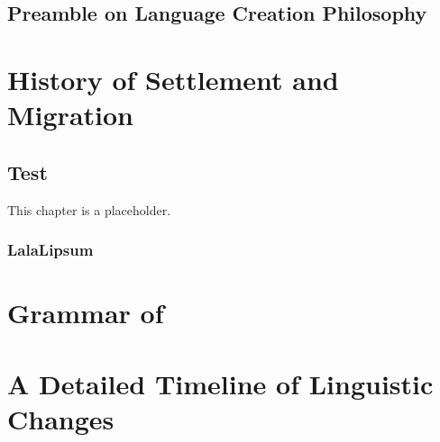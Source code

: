 \documentclass[a4paper,11pt,twoside,openright]{memoir}
\begin{document}
\begin{titlingpage}
\titleTMB
\clearpage
\end{titlingpage}

\frontmatter

\chapter{Preamble on Language Creation Philosophy}
\cleardoublepage

\tableofcontents

\mainmatter
{}

\part{History of \planetadjective{} Settlement and Migration}

\chapter{Test}

This chapter is a placeholder. \engma{} \Engma{}

\lipsum[4-10]

\section{LalaLipsum}
\lipsum[11-17]

\part{Grammar of \onelangname}



\part{A Detailed Timeline of Linguistic Changes}


\end{document}
